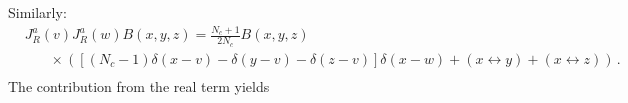 \documentclass[11pt,a4paper]{article}
\begin{document}
Similarly:
\begin{equation}\begin{split}
&J_{R}^{a}(v)J_{R}^{a}(w)B(x,y,z)
=\frac{N_{c}+1}{2N_{c}}B(x,y,z)\\
&\ \ \ \ \ \ \ \ \times \left(\left[(N_{c}-1)\delta(x-v)-\delta(y-v)-\delta(z-v)\right]\delta(x-w)+\left(x\leftrightarrow y\right)+\left(x\leftrightarrow z\right)\right)\,.\\
\end{split}\end{equation}
The contribution from the real term yields
\end{document}
